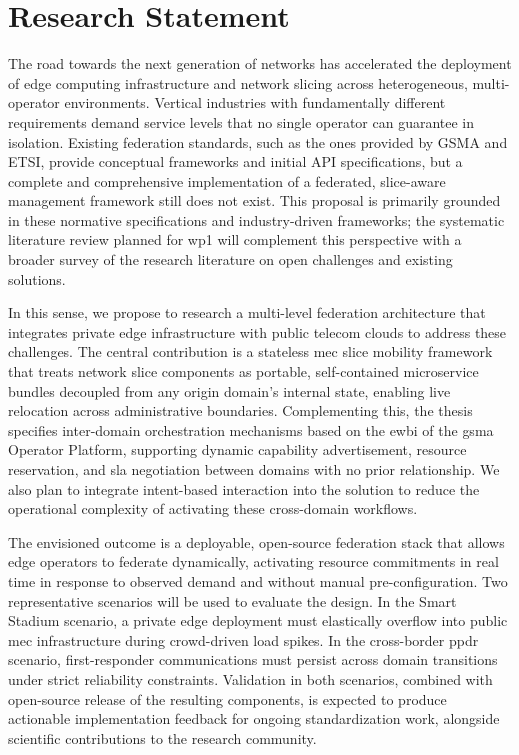 \chapter{Research Statement}
\label{chap:research-statement}

\begin{introduction}

\end{introduction}

The road towards the next generation of networks has accelerated the deployment of edge computing infrastructure and network slicing across heterogeneous, multi-operator environments. Vertical industries with fundamentally different requirements demand service levels that no single operator can guarantee in isolation. Existing federation standards, such as the ones provided by GSMA and ETSI, provide conceptual frameworks and initial API specifications, but a complete and comprehensive implementation of a federated, slice-aware management framework still does not exist. This proposal is primarily grounded in these normative specifications and industry-driven frameworks; the systematic literature review planned for \ac{wp}1 will complement this perspective with a broader survey of the research literature on open challenges and existing solutions.

In this sense, we propose to research a multi-level federation architecture that integrates private edge infrastructure with public telecom clouds to address these challenges. The central contribution is a stateless \ac{mec} slice mobility framework that treats network slice components as portable, self-contained microservice bundles decoupled from any origin domain's internal state, enabling live relocation across administrative boundaries. Complementing this, the thesis specifies inter-domain orchestration mechanisms based on the \ac{ewbi} of the \ac{gsma} Operator Platform, supporting dynamic capability advertisement, resource reservation, and \ac{sla} negotiation between domains with no prior relationship. We also plan to integrate intent-based interaction into the solution to reduce the operational complexity of activating these cross-domain workflows.

The envisioned outcome is a deployable, open-source federation stack that allows edge operators to federate dynamically, activating resource commitments in real time in response to observed demand and without manual pre-configuration. Two representative scenarios will be used to evaluate the design. In the Smart Stadium scenario, a private edge deployment must elastically overflow into public \ac{mec} infrastructure during crowd-driven load spikes. In the cross-border \ac{ppdr} scenario, first-responder communications must persist across domain transitions under strict reliability constraints. Validation in both scenarios, combined with open-source release of the resulting components, is expected to produce actionable implementation feedback for ongoing standardization work, alongside scientific contributions to the research community.

